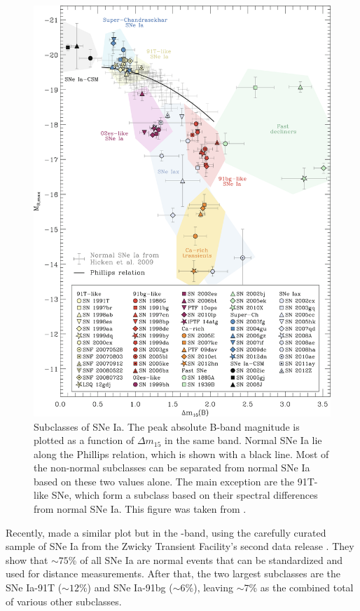 \documentclass[a4paper,oneside,12pt, class=Latex/Classes/PhDthesisPSnPDF, crop=false]{standalone}
\begin{document}
\begin{figure}
    \centering
    \includegraphics[width=\textwidth]{../Images/chapter_1/Taub_plot.png}
    \caption{Subclasses of SNe Ia. The peak absolute B-band magnitude is plotted as a function of $\Delta m_{15}$ in the same band. Normal SNe Ia lie along the Phillips relation, which is shown with a black line. Most of the non-normal subclasses can be separated from normal SNe Ia based on these two values alone. The main exception are the 91T-like SNe, which form a subclass based on their spectral differences from normal SNe Ia. This figure was taken from \citet{Taubenberger_plot}.}
    \label{Taub_plot}
\end{figure}

Recently, \citet{DR2_diversity} made a similar plot but in the \ztfg-band, using the carefully curated sample of SNe Ia from the Zwicky Transient Facility's second data release \citep[ZTF SN Ia DR2,][Smith et al., in prep.]{DR2_Overview}. They show that $\sim75$\% of all SNe Ia are normal events that can be standardized and used for distance measurements. After that, the two largest subclasses are the SNe Ia-91T ($\sim12$\%) and SNe Ia-91bg ($\sim6$\%), leaving $\sim7$\% as the combined total of various other subclasses.
\end{document}
